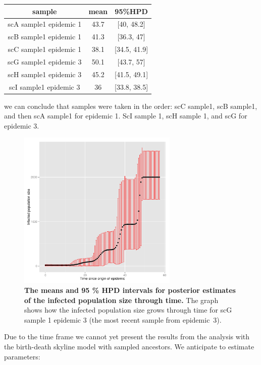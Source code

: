\documentclass[12pt]{article}
\begin{document}
\vskip2mm

\begin{tabular} {ccc}
sample & mean & 95\%HPD \\
\hline
scA sample1 epidemic 1 & 43.7 & [40, 48.2] \\
scB sample1 epidemic 1 & 41.3 & [36.3, 47] \\
scC sample1 epidemic 1 & 38.1 & [34.5, 41.9] \\
scG sample1 epidemic 3 & 50.1 & [43.7, 57] \\
scH sample1 epidemic 3 & 45.2 & [41.5, 49.1] \\
scI sample1 epidemic 3 & 36 & [33.8, 38.5]  \\
\end{tabular}

\vskip2mm

\noindent we can conclude that samples were taken in the order: scC sample1, scB sample1, and then scA sample1 for epidemic 1. ScI sample 1, scH sample 1, and  scG for epidemic 3. 

\begin{center} 
\begin{figure}[!h]
\includegraphics[width=3in]{popSize}
\caption{\footnotesize {\bf The means and 95 \% HPD intervals for posterior estimates of the infected population size through time.} 
The graph shows how the infected population size  grows through time for scG sample 1 epidemic 3 (the most recent sample from epidemic~3).} 
\label{fig: popSize} 
\end{figure}
\end{center} 

Due to the time frame we cannot yet present the results from the analysis with the birth-death skyline model with sampled ancestors. We anticipate to estimate parameters: 
\vskip2mm
\end{document}
